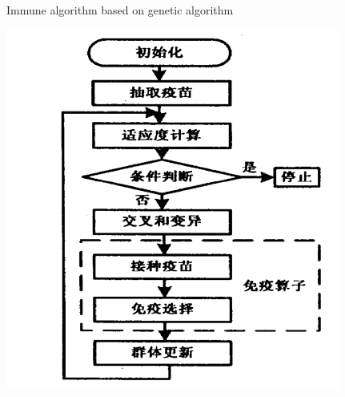 \begin{frame}{Immune algorithm based on genetic algorithm}
 
  
  \par
  \centering
  \includegraphics[scale=0.6]{img/5.PNG}
  \par
  
\end{frame}

